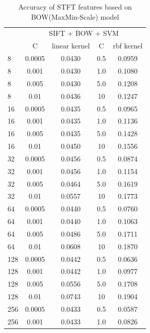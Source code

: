 \documentclass[conference]{IEEEtran}
\begin{document}
\begin{table}[htbp]
	\centering
	\newcommand{\tabincell}[2]{\begin{tabular}{@{}#1@{}}#2\end{tabular}}
	\renewcommand\arraystretch{1.0}
	\caption{Accuracy of STFT features based on BOW(MaxMin-Scale) model}
	\label{base6}%
	\begin{tabular}{@{}p{1cm}<{\centering}|c|c|c|c}
		\hline
		\multirow{2}{*}{\diagbox[height=2\line,width=1.42cm,font=\tiny]{$k$}{Acc.}{$\mathit{M}$}} &
		\multicolumn{4}{c}{SIFT + BOW + SVM}\\
		\cline{2-5}
		& {C} & {linear kernel} & {C} & {rbf kernel}\\
		\hline
		8   & 0.0005 & 0.0430 & 0.5 & 0.0959\\
		8   & 0.001 & 0.0430 & 1.0 & 0.1080\\
		8   & 0.005 & 0.0430 & 5.0 & 0.1208\\
        8   & 0.01  & 0.0436 & 10 & 0.1247\\
        \hline
		16   & 0.0005  & 0.0435 & 0.5 & 0.0965\\
		16   & 0.001  & 0.0435 & 1.0 & 0.1136\\
		16   & 0.005  & 0.0435 & 5.0 & 0.1428\\
        16   & 0.01  & 0.0450 & 10 & 0.1556\\
        \hline
		32   & 0.0005  & 0.0456 & 0.5 & 0.0874\\
		32   & 0.001  & 0.0456 & 1.0 & 0.1154\\
		32   & 0.005  & 0.0464 & 5.0 & 0.1619\\
        32   & 0.01  & 0.0557 & 10 & 0.1773\\
        \hline
		64   & 0.0005  & 0.0440 & 0.5 & 0.0760\\
		64   & 0.001  & 0.0440 & 1.0 & 0.1063\\
		64   & 0.005  & 0.0486 & 5.0 & 0.1711\\
        64   & 0.01  & 0.0608 & 10 & 0.1870\\
        \hline
		128   & 0.0005  & 0.0442 & 0.5 & 0.0636\\
		128   & 0.001  & 0.0442 & 1.0 & 0.0977\\
		128   & 0.005  & 0.0556 & 5.0 & 0.1708\\
        128   & 0.01  & 0.0743 & 10 & 0.1904\\
        \hline
		256   & 0.0005  & 0.0433 & 0.5 & 0.0587\\
		256   & 0.001  & 0.0433 & 1.0 & 0.0826\\

\end{tabular}
\end{table}
\end{document}

